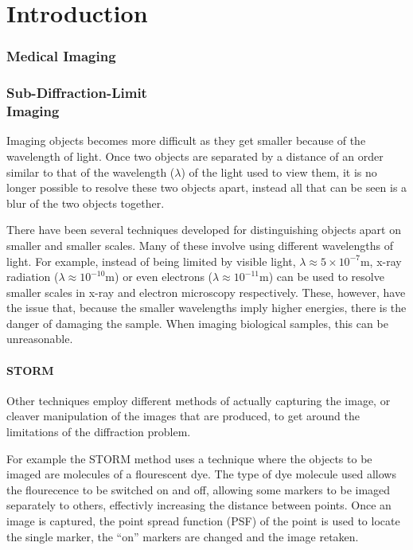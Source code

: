 \part{Introduction}

\section{Medical Imaging}
\label{sec:section_name}

\section[Sub-Diffraction-Limit Imaging]{Sub-Diffraction-Limit\\ Imaging}
\label{sec:sub_diffraction_limit_imaging}

Imaging objects becomes more difficult as they get smaller because of the
wavelength of light. Once two objects are separated by a distance of an order
similar to that of the wavelength ($\lambda$) of the light used to view them,
it is no longer possible to resolve these two objects apart, instead all that
can be seen is a blur of the two objects together.

There have been several techniques developed for distinguishing objects apart
on smaller and smaller scales. Many of these involve using different
wavelengths of light.  For example, instead of being limited by visible light,
$\lambda \approx 5\times 10^{-7} \textrm{m}$, x-ray radiation ($\lambda \approx
10^{-10} \textrm{m}$) or even electrons ($\lambda \approx 10^{-11} \textrm{m}$)
can be used to resolve smaller scales in x-ray and electron microscopy
respectively. These, however, have the issue that, because the smaller
wavelengths imply higher energies, there is the danger of damaging the sample.
When imaging biological samples, this can be unreasonable.

\subsection{STORM}
\label{sub:storm}

Other techniques employ different methods of actually capturing the image, or
cleaver manipulation of the images that are produced, to get around the
limitations of the diffraction problem.

For example the STORM method\cite{rust2006sub} uses a technique where the
objects to be imaged are molecules of a flourescent dye. The type of dye
molecule used allows the flourecence to be switched on and off, allowing some
markers to be imaged separately to others, effectivly increasing the distance
between points. Once an image is captured, the point spread function (PSF) of
the point is used to locate the single marker, the ``on'' markers are changed
and the image retaken.
